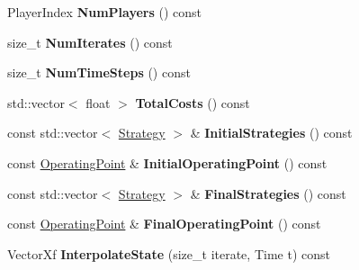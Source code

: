 \begin{DoxyCompactItemize}
\item 
Player\+Index {\bfseries Num\+Players} () const \hypertarget{classilqgames_1_1_solver_log_af2b335909e75f63a910f4f734890d4d7}{}\label{classilqgames_1_1_solver_log_af2b335909e75f63a910f4f734890d4d7}

\item 
size\+\_\+t {\bfseries Num\+Iterates} () const \hypertarget{classilqgames_1_1_solver_log_a205590ee3aadd88aaf11ef6b5bb774dc}{}\label{classilqgames_1_1_solver_log_a205590ee3aadd88aaf11ef6b5bb774dc}

\item 
size\+\_\+t {\bfseries Num\+Time\+Steps} () const \hypertarget{classilqgames_1_1_solver_log_a21898bab7582fcf5ca77fe336479b07b}{}\label{classilqgames_1_1_solver_log_a21898bab7582fcf5ca77fe336479b07b}

\item 
std\+::vector$<$ float $>$ {\bfseries Total\+Costs} () const \hypertarget{classilqgames_1_1_solver_log_a175236dc1d4d3028511b0c82500095c5}{}\label{classilqgames_1_1_solver_log_a175236dc1d4d3028511b0c82500095c5}

\item 
const std\+::vector$<$ \hyperlink{structilqgames_1_1_strategy}{Strategy} $>$ \& {\bfseries Initial\+Strategies} () const \hypertarget{classilqgames_1_1_solver_log_a2ac6ab2634e314d3eb7cc556850d7636}{}\label{classilqgames_1_1_solver_log_a2ac6ab2634e314d3eb7cc556850d7636}

\item 
const \hyperlink{structilqgames_1_1_operating_point}{Operating\+Point} \& {\bfseries Initial\+Operating\+Point} () const \hypertarget{classilqgames_1_1_solver_log_adf4581a26df80a6b69458f2d4f84deac}{}\label{classilqgames_1_1_solver_log_adf4581a26df80a6b69458f2d4f84deac}

\item 
const std\+::vector$<$ \hyperlink{structilqgames_1_1_strategy}{Strategy} $>$ \& {\bfseries Final\+Strategies} () const \hypertarget{classilqgames_1_1_solver_log_a3e998ebe01b5437dbea33c1e32739cbe}{}\label{classilqgames_1_1_solver_log_a3e998ebe01b5437dbea33c1e32739cbe}

\item 
const \hyperlink{structilqgames_1_1_operating_point}{Operating\+Point} \& {\bfseries Final\+Operating\+Point} () const \hypertarget{classilqgames_1_1_solver_log_ac02232ae7fa57715bc0b1795f4dd059f}{}\label{classilqgames_1_1_solver_log_ac02232ae7fa57715bc0b1795f4dd059f}

\item 
Vector\+Xf {\bfseries Interpolate\+State} (size\+\_\+t iterate, Time t) const \hypertarget{classilqgames_1_1_solver_log_a86b8dd605c03955a6fbafa2dc0b2a341}{}\label{classilqgames_1_1_solver_log_a86b8dd605c03955a6fbafa2dc0b2a341}


\end{DoxyCompactItemize}
